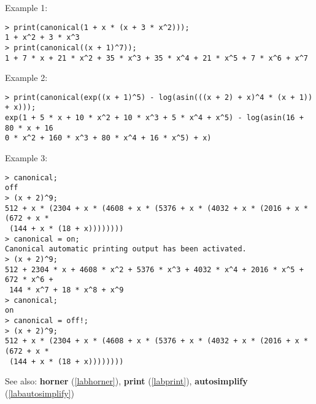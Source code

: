 \noindent Example 1: 
\begin{center}\begin{minipage}{15cm}\begin{Verbatim}[frame=single]
> print(canonical(1 + x * (x + 3 * x^2)));
1 + x^2 + 3 * x^3
> print(canonical((x + 1)^7));
1 + 7 * x + 21 * x^2 + 35 * x^3 + 35 * x^4 + 21 * x^5 + 7 * x^6 + x^7
\end{Verbatim}
\end{minipage}\end{center}
\noindent Example 2: 
\begin{center}\begin{minipage}{15cm}\begin{Verbatim}[frame=single]
> print(canonical(exp((x + 1)^5) - log(asin(((x + 2) + x)^4 * (x + 1)) + x)));
exp(1 + 5 * x + 10 * x^2 + 10 * x^3 + 5 * x^4 + x^5) - log(asin(16 + 80 * x + 16
0 * x^2 + 160 * x^3 + 80 * x^4 + 16 * x^5) + x)
\end{Verbatim}
\end{minipage}\end{center}
\noindent Example 3: 
\begin{center}\begin{minipage}{15cm}\begin{Verbatim}[frame=single]
> canonical;
off
> (x + 2)^9;
512 + x * (2304 + x * (4608 + x * (5376 + x * (4032 + x * (2016 + x * (672 + x *
 (144 + x * (18 + x))))))))
> canonical = on;
Canonical automatic printing output has been activated.
> (x + 2)^9;
512 + 2304 * x + 4608 * x^2 + 5376 * x^3 + 4032 * x^4 + 2016 * x^5 + 672 * x^6 +
 144 * x^7 + 18 * x^8 + x^9
> canonical;
on
> canonical = off!;
> (x + 2)^9;
512 + x * (2304 + x * (4608 + x * (5376 + x * (4032 + x * (2016 + x * (672 + x *
 (144 + x * (18 + x))))))))
\end{Verbatim}
\end{minipage}\end{center}
See also: \textbf{horner} (\ref{labhorner}), \textbf{print} (\ref{labprint}), \textbf{autosimplify} (\ref{labautosimplify})
